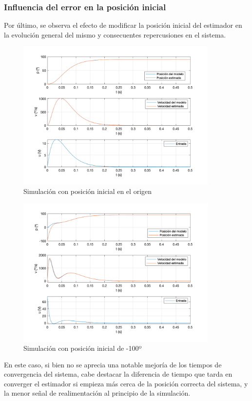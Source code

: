 \documentclass[a4paper, 12pt]{article}
\begin{document}
\subsubsection{Influencia del error en la posición inicial}
Por último, se observa el efecto de modificar la posición inicial del estimador en la evolución general del mismo y consecuentes repercusiones en el sistema. 
\begin{figure}[H]
	\centering
	\includegraphics*[height = 7.5cm]{figs/p4/ini0}
	\caption{Simulación con posición inicial en el origen}
\end{figure}
\begin{figure}[H]
	\centering
	\includegraphics*[height = 7.5cm]{figs/p4/ini-100}
	\caption{Simulación con posición inicial de -100º}
\end{figure}

En este caso, si bien no se aprecia una notable mejoría de los tiempos de convergencia del sistema, cabe destacar la diferencia de tiempo que tarda en converger el estimador si empieza más cerca de la posición correcta del sistema, y la menor señal de realimentación al principio de la simulación. 
\end{document}
